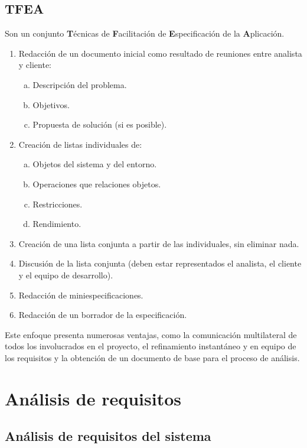 \subsection{TFEA}
Son un conjunto \textbf{T}écnicas de \textbf{F}acilitación de \textbf{E}specificación de la \textbf{A}plicación.
\begin{enumerate}
   \item Redacción de un documento inicial como resultado de reuniones entre analista y cliente:
\begin{enumerate}[a.]
    \item Descripción del problema.
    \item Objetivos.
    \item Propuesta de solución (si es posible).
\end{enumerate}
\item Creación de listas individuales de:
    \begin{enumerate}[a.]
        \item Objetos del sistema y del entorno.
        \item Operaciones que relaciones objetos.
        \item Restricciones.
        \item Rendimiento.   
    \end{enumerate}
\item Creación de una lista conjunta a partir de las individuales, sin eliminar nada.
\item Discusión de la lista conjunta (deben estar representados el analista, el cliente y el equipo de desarrollo).
\item Redacción de miniespecificaciones.
\item Redacción de un borrador de la especificación.
\end{enumerate}
Este enfoque presenta numerosas ventajas, como la comunicación multilateral de todos los involucrados en el proyecto, el refinamiento instantáneo y en equipo de los requisitos y la obtención de un documento de base para el proceso de análisis. 


\section{Análisis de requisitos} 

\subsection{Análisis de requisitos del sistema}


